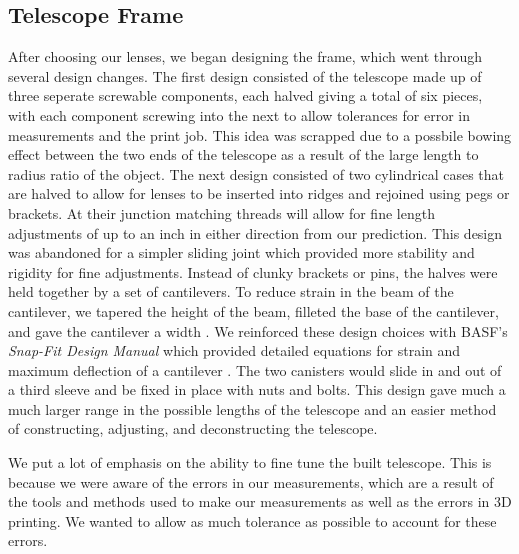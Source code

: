 
\subsection{Telescope Frame}
After choosing our lenses, we began designing the frame, which went through several design changes. The first design consisted of the telescope made up of three seperate screwable components, each halved giving a total of six pieces, with each component screwing into the next to allow tolerances for error in measurements and the print job. This idea was scrapped due to a possbile bowing effect between the two ends of the telescope as a result of the large length to radius ratio of the object. The next design consisted of two cylindrical cases that are halved to allow for lenses to be inserted into ridges and rejoined using pegs or brackets. At their junction matching threads will allow for fine length adjustments of up to an inch in either direction from our prediction. This design was abandoned for a simpler sliding joint which provided more stability and rigidity for fine adjustments. Instead of clunky brackets or pins, the halves were held together by a set of cantilevers. To reduce strain in the beam of the cantilever, we tapered the height of the beam, filleted the base of the cantilever, and gave the cantilever a width \cite{canti}. We reinforced these design choices with BASF's \textit{Snap-Fit Design Manual} which provided detailed equations for strain and maximum deflection of a cantilever \cite{basf}. The two canisters would slide in and out of a third sleeve and be fixed in place with nuts and bolts. This design gave much a much larger range in the possible lengths of the telescope and an easier method of constructing, adjusting, and deconstructing the telescope.

We put a lot of emphasis on the ability to fine tune the built telescope. This is because we were aware of the errors in our measurements, which are a result of the tools and methods used to make our measurements as well as the errors in 3D printing. We wanted to allow as much tolerance as possible to account for these errors.

